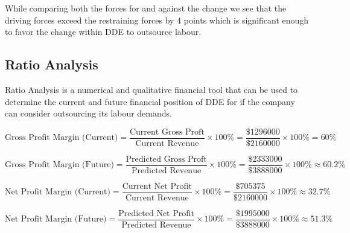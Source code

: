 	{While comparing both the forces for and against the change we see that the driving forces exceed the restraining forces by 4 points which is significant enough to favor the change within DDE to outsource labour.}

\subsection{Ratio Analysis}

	{Ratio Analysis is a numerical and qualitative financial tool that can be used to determine the current and future financial position of DDE for if the company can consider outsourcing its labour demands.}



	$$\text{Gross Profit Margin (Current)} = \frac{\text{Current Gross Proft}}{\text{Current Revenue}}\times 100\% = \frac{\$1296000}{\$2160000}\times 100\% = 60\%$$


	$$\text{Gross Profit Margin (Future)} = \frac{\text{Predicted Gross Proft}}{\text{Predicted Revenue}}\times 100\% = \frac{\$2333000}{\$3888000}\times 100\% \approx 60.2\%$$
	

	$$\text{Net Profit Margin (Current)} = \frac{\text{Current Net Profit}}{\text{Current Revenue}}\times 100\% = \frac{\$705375}{\$2160000}\times 100\% \approx 32.7\%$$
	

	$$\text{Net Profit Margin (Future)} = \frac{\text{Predicted Net Profit}}{\text{Predicted Revenue}}\times 100\% = \frac{\$1995000}{\$3888000}\times 100\% \approx 51.3\%$$
	
